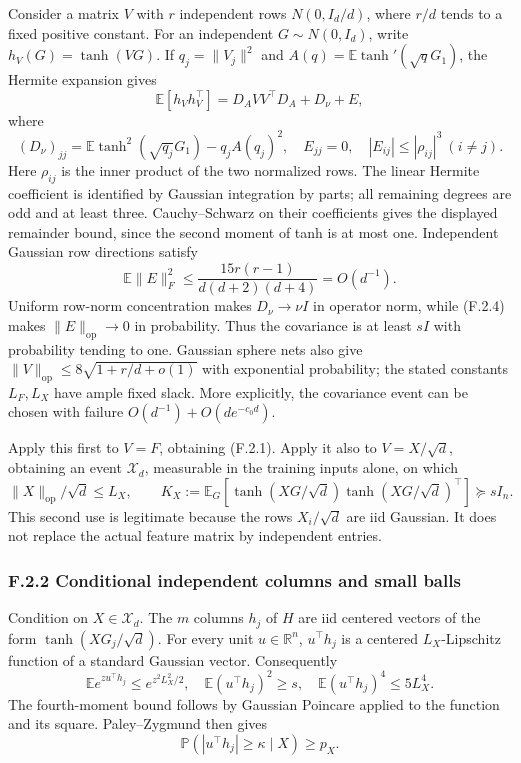 \documentclass[
  11pt,
  a4paper,
]{article}
\begin{document}
Consider a matrix \(V\) with \(r\) independent rows \(N(0,I_d/d)\),
where \(r/d\) tends to a fixed positive constant. For an independent
\(G\sim N(0,I_d)\), write \(h_V(G)=\tanh(VG)\). If \(q_j=\|V_j\|^2\) and
\(A(q)=\mathbb E\tanh'(\sqrt qG_1)\), the Hermite expansion gives \[
\mathbb E[h_Vh_V^\top]
=D_AVV^\top D_A+D_\nu+E,
\tag{F.2.3}
\] where \[
(D_\nu)_{jj}=\mathbb E\tanh^2(\sqrt{q_j}G_1)-q_jA(q_j)^2,
\quad E_{jj}=0,
\quad |E_{ij}|\le|\rho_{ij}|^3\ (i\ne j).
\] Here \(\rho_{ij}\) is the inner product of the two normalized rows.
The linear Hermite coefficient is identified by Gaussian integration by
parts; all remaining degrees are odd and at least three. Cauchy--Schwarz
on their coefficients gives the displayed remainder bound, since the
second moment of tanh is at most one. Independent Gaussian row
directions satisfy \[
\mathbb E\|E\|_F^2
\le\frac{15r(r-1)}{d(d+2)(d+4)}=O(d^{-1}).
\tag{F.2.4}
\] Uniform row-norm concentration makes \(D_\nu\to\nu I\) in operator
norm, while (F.2.4) makes \(\|E\|_{\mathrm{op}}\to0\) in probability.
Thus the covariance is at least \(sI\) with probability tending to one.
Gaussian sphere nets also give
\(\|V\|_{\mathrm{op}}\le8\sqrt{1+r/d+o(1)}\) with exponential
probability; the stated constants \(L_F,L_X\) have ample fixed slack.
More explicitly, the covariance event can be chosen with failure
\(O(d^{-1})+O(de^{-c_0d})\).

Apply this first to \(V=F\), obtaining (F.2.1). Apply it also to
\(V=X/\sqrt d\), obtaining an event \(\mathcal X_d\), measurable in the
training inputs alone, on which \[
\|X\|_{\mathrm{op}}/\sqrt d\le L_X,\qquad
K_X:=\mathbb E_G[\tanh(XG/\sqrt d)\tanh(XG/\sqrt d)^\top]
\succeq sI_n.
\tag{F.2.5}
\] This second use is legitimate because the rows \(X_i/\sqrt d\) are
iid Gaussian. It does not replace the actual feature matrix by
independent entries.

\hypertarget{f.2.2-conditional-independent-columns-and-small-balls}{%
\subsubsection{F.2.2 Conditional independent columns and small
balls}\label{f.2.2-conditional-independent-columns-and-small-balls}}

Condition on \(X\in\mathcal X_d\). The \(m\) columns \(h_j\) of \(H\)
are iid centered vectors of the form \(\tanh(XG_j/\sqrt d)\). For every
unit \(u\in\mathbb R^n\), \(u^\top h_j\) is a centered \(L_X\)-Lipschitz
function of a standard Gaussian vector. Consequently \[
\mathbb E e^{z u^\top h_j}\le e^{z^2L_X^2/2},\quad
\mathbb E(u^\top h_j)^2\ge s,\quad
\mathbb E(u^\top h_j)^4\le5L_X^4.
\tag{F.2.6}
\] The fourth-moment bound follows by Gaussian Poincare applied to the
function and its square. Paley--Zygmund then gives \[
\mathbb P(|u^\top h_j|\ge\kappa\mid X)\ge p_X.
\tag{F.2.7}
\]
\end{document}
